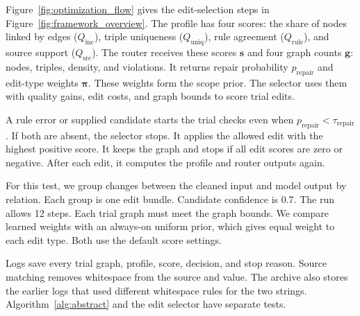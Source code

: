 Figure~\ref{fig:optimization_flow} gives the edit-selection steps in
Figure~\ref{fig:framework_overview}. The profile has four scores:
the share of nodes linked by edges ($Q_{\mathrm{inc}}$), triple uniqueness
($Q_{\mathrm{uniq}}$), rule agreement ($Q_{\mathrm{rule}}$), and source
support ($Q_{\mathrm{src}}$). The router receives these scores $\mathbf{s}$
and four graph counts $\mathbf{g}$: nodes, triples, density, and violations.
It returns repair probability $p_{\mathrm{repair}}$ and edit-type weights
$\boldsymbol{\pi}$. These weights form the scope prior. The selector uses
them with quality gains, edit costs, and graph bounds to score trial edits.

A rule error or supplied candidate starts the trial checks even when
$p_{\mathrm{repair}}<\tau_{\mathrm{repair}}$. If both are absent, the selector
stops. It applies the allowed edit with the highest positive score.
It keeps the graph and stops if all edit scores are zero or negative.
After each edit, it computes the profile and router outputs again.

For this test, we group changes between the cleaned input and model output
by relation. Each group is one edit bundle. Candidate confidence is 0.7.
The run allows 12 steps. Each trial graph must meet the graph bounds.
We compare learned weights with an always-on uniform prior, which gives
equal weight to each edit type. Both use the default score settings.

Logs save every trial graph, profile, score, decision, and stop reason.
Source matching removes whitespace from the source and value.
The archive also stores the earlier logs that used different whitespace
rules for the two strings. Algorithm~\ref{alg:abstract} and the edit selector
have separate tests.


